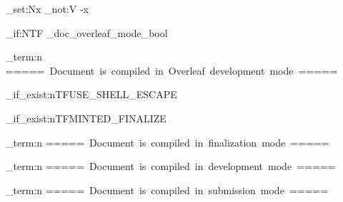 \ExplSyntaxOn

\makeatletter

\tl_set:Nx \minted@optlistcl@g
{
    \exp_not:V \minted@optlistcl@g \space -x \space 
}

\bool_if:NTF \g_doc_overleaf_mode_bool
{
    \iow_term:n {=====~Document~is~compiled~in~Overleaf~development~mode~=====}
    \usepackage{minted}
}
{
    
    \file_if_exist:nTF{USE_SHELL_ESCAPE}
    {
        \file_if_exist:nTF{MINTED_FINALIZE}
        {
            \iow_term:n {=====~Document~is~compiled~in~finalization~mode~=====}
            \usepackage[finalizecache,cachedir={minted-frozen}]{minted}
        }
        {
            \iow_term:n {=====~Document~is~compiled~in~development~mode~=====}
            \usepackage{minted}
        }
    }
    {
        \iow_term:n {=====~Document~is~compiled~in~submission~mode~=====}
        \usepackage[frozencache,cachedir={minted-frozen}]{minted}
    }
}
\makeatother
\ExplSyntaxOff